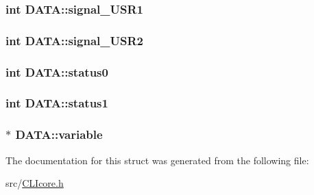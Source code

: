 \subsubsection[{signal\+\_\+\+U\+S\+R1}]{\setlength{\rightskip}{0pt plus 5cm}int D\+A\+T\+A\+::signal\+\_\+\+U\+S\+R1}\label{structDATA_a64bae9d671e98229a54fea43d5d4f9b5}
\hypertarget{structDATA_a2be71623c71eb07003ff60f14240b31a}{}
\subsubsection[{signal\+\_\+\+U\+S\+R2}]{\setlength{\rightskip}{0pt plus 5cm}int D\+A\+T\+A\+::signal\+\_\+\+U\+S\+R2}\label{structDATA_a2be71623c71eb07003ff60f14240b31a}
\hypertarget{structDATA_a14eafa363f5cd5dd7ff9ca0744029565}{}
\subsubsection[{status0}]{\setlength{\rightskip}{0pt plus 5cm}int D\+A\+T\+A\+::status0}\label{structDATA_a14eafa363f5cd5dd7ff9ca0744029565}
\hypertarget{structDATA_acc1a46fa384934e24a89660d8d0c9f7a}{}
\subsubsection[{status1}]{\setlength{\rightskip}{0pt plus 5cm}int D\+A\+T\+A\+::status1}\label{structDATA_acc1a46fa384934e24a89660d8d0c9f7a}
\hypertarget{structDATA_a38336f0ef793c2aef2a6f3a20e3e361b}{}
\subsubsection[{variable}]{$\ast$ D\+A\+T\+A\+::variable}\label{structDATA_a38336f0ef793c2aef2a6f3a20e3e361b}


The documentation for this struct was generated from the following file\+:\begin{DoxyCompactItemize}
\item 
src/\hyperlink{CLIcore_8h}{C\+L\+Icore.\+h}\end{DoxyCompactItemize}
